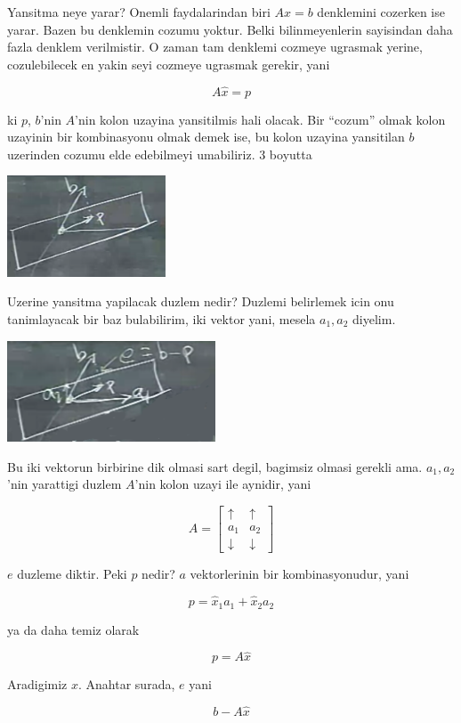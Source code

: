 \documentclass[12pt,fleqn]{article}\usepackage{../common}
\begin{document}
Yansitma neye yarar? Onemli faydalarindan biri $Ax = b$ denklemini cozerken
ise yarar. Bazen bu denklemin cozumu yoktur. Belki bilinmeyenlerin sayisindan
daha fazla denklem verilmistir. O zaman tam denklemi cozmeye ugrasmak
yerine, cozulebilecek en yakin seyi cozmeye ugrasmak gerekir, yani 

\[ A\hat{x} = p \]

ki $p$, $b$'nin $A$'nin kolon uzayina yansitilmis hali olacak. Bir
``cozum'' olmak kolon uzayinin bir kombinasyonu olmak demek ise, bu kolon
uzayina yansitilan $b$ uzerinden cozumu elde edebilmeyi umabiliriz. 3
boyutta

\includegraphics[height=3cm]{15_4.png}

Uzerine yansitma yapilacak duzlem nedir? Duzlemi belirlemek icin onu
tanimlayacak bir baz bulabilirim, iki vektor yani, mesela $a_1,a_2$
diyelim. 

\includegraphics[height=3cm]{15_5.png}

Bu iki vektorun birbirine dik olmasi sart degil, bagimsiz olmasi gerekli
ama. $a_1,a_2$'nin yarattigi duzlem $A$'nin kolon uzayi ile aynidir, yani

\[ A = 
\left[\begin{array}{rr}
\uparrow &  \uparrow \\
a_1 &   a_2 \\
\downarrow &  \downarrow 
\end{array}\right]
 \]

$e$ duzleme diktir. Peki $p$ nedir? $a$ vektorlerinin bir kombinasyonudur, yani

\[ p = \hat{x}_1a_1 + \hat{x}_2a_2 \]

ya da daha temiz olarak

\[ p = A\hat{x} \]

Aradigimiz $\hat{x}$. Anahtar surada, $e$ yani 

\[  b - A\hat{x}\]
\end{document}
